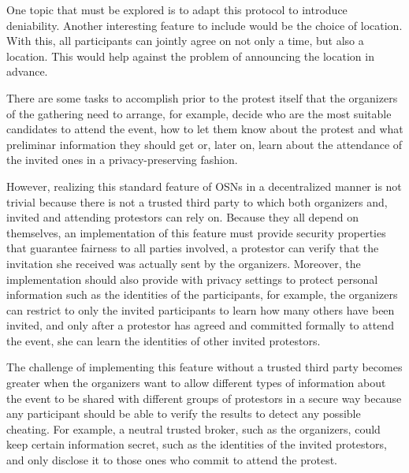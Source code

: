 One topic that must be explored is to adapt this protocol to introduce 
deniability.
Another interesting feature to include would be the choice of location.
With this, all participants can jointly agree on not only a time, but also 
a location.
This would help against the problem of announcing the location in advance.

There are some tasks to accomplish prior to the protest itself that the organizers 
of the gathering need to arrange, for example, decide who are the most suitable 
candidates to attend the event, how to let them know about the protest and what 
preliminar information they should get or, later on, learn about the attendance of 
the invited ones in a privacy-preserving fashion.

However, realizing this standard feature of OSNs in a decentralized manner is not trivial 
because there is not a trusted third party to which both organizers and, invited and 
attending protestors can rely on. Because they all depend on themselves, an 
implementation of this feature must provide security properties that guarantee fairness 
to all parties involved, \eg a protestor can verify that the invitation she received 
was actually sent by the organizers. Moreover, the implementation should also provide 
with privacy settings to protect personal information such as the identities of 
the participants, for example, the organizers can restrict to only the invited participants 
to learn how many others have been invited, and only after a protestor has agreed 
and committed formally to attend the event, she can learn the identities of other 
invited protestors.

The challenge of implementing this feature without a trusted third party becomes 
greater when the organizers want to allow different types of information about the 
event to be shared with different groups of protestors in a secure way because any 
participant should be able to verify the results to detect any possible cheating. 
For example, a neutral trusted broker, such as the organizers, could keep certain 
information secret, such as the identities of the invited protestors, and only disclose 
it to those ones who commit to attend the protest. 

